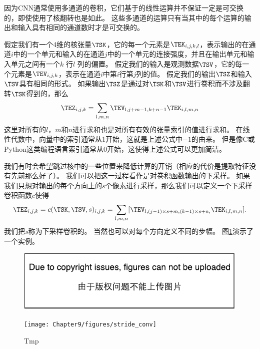 因为\gls{CNN}通常使用多通道的卷积，它们基于的线性运算并不保证一定是可交换的，即使使用了核翻转也是如此。
这些多通道的运算只有当其中的每个运算的输出和输入具有相同的通道数时才是可交换的。

假定我们有一个4维的核张量$\TSK$，它的每一个元素是$\TEK_{i,j,k,l}$，表示输出的在通道$i$中的一个单元和输入的在通道$j$中的一个单元的连接强度，并且在输出单元和输入单元之间有一个$k$ 行$l$ 列的偏置。
假定我们的输入是观测数据$\TSV$，它的每一个元素是$\TEV_{i,j,k}$，表示在通道$i$中第$i$行第$j$列的值。
假定我们的输出$\TSZ$和输入$\TSV$具有相同的形式。
如果输出$\TSZ$是通过对$\TSK$和$\TSV$进行卷积而不涉及翻转$\TSK$得到的，那么
\begin{equation}
\TEZ_{i,j,k} = \sum_{l,m,n} \TEV_{l, j+m-1, k+n-1} \TEK_{i,l,m,n}
\end{equation}
这里对所有的$l$，$m$和$n$进行求和也是对所有有效的张量索引的值进行求和。
在线性代数中，向量中的索引通常从1开始，这就是上述公式中$-1$的由来。
但是像C或Python这类编程语言索引通常从0开始，这使得上述公式可以更加简洁。

 
我们有时会希望跳过核中的一些位置来降低计算的开销（相应的代价是提取特征没有先前那么好了）。
我们可以把这一过程看作是对卷积函数输出的下采样。
如果我们只想对输出的每个方向上的$s$个像素进行采样，那么我们可以定义一个下采样卷积函数$c$使得
\begin{equation}
\TEZ_{i,j,k} = c(\TSK, \TSV, s)_{i,j,k} = \sum_{l,m,n} [\TEV_{l,(j-1)\times s+m, (k-1)\times s +n,}
 \TEK_{i,l,m,n}].
 \label{eq: 9.8}
\end{equation}
我们把$s$称为下采样卷积的。
当然也可以对每个方向定义不同的步幅。
图\ref{fig:chap9_stride_conv}演示了一个实例。
\begin{figure}[!htb]
\ifOpenSource
\centerline{\includegraphics{figure.pdf}}
\else
\centerline{\texttt{[image: Chapter9/figures/stride\_conv]}}
\fi
\caption{Tmp}
\label{fig:chap9_stride_conv}
\end{figure}


